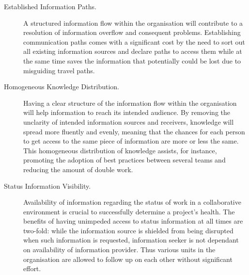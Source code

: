 \begin{description}

   \item[Established Information Paths.] A structured information flow within the organisation will contribute to a resolution of information overflow and consequent problems. Establishing communication paths comes with a significant cost by the need to sort out all existing information sources and declare paths to access them while at the same time saves the information that potentially could be lost due to misguiding travel paths.
   

   \item[Homogeneous Knowledge Distribution.] Having a clear structure of the information flow within the organisation will help information to reach its intended audience. By removing the unclarity of intended information sources and receivers, knowledge will spread more fluently and evenly, meaning that the chances for each person to get access to the same piece of information are more or less the same. This homogeneous distribution of knowledge assists, for instance, promoting the adoption of best practices between several teams and reducing the amount of double work.

   \item[Status Information Visibility.] Availability of information regarding the status of work in a collaborative environment is crucial to successfully determine a project's health. The benefits of having unimpeded access to status information at all times are two-fold: while the information source is shielded from being disrupted when such information is requested, information seeker is not dependant on availability of information provider. Thus various units in the organisation are allowed to follow up on each other without significant effort.


\end{description}


